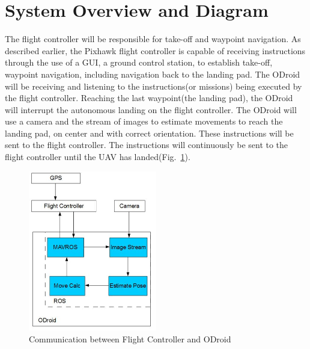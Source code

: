 \section{System Overview and Diagram}
The flight controller will be responsible for take-off and waypoint navigation. As described earlier, the Pixhawk flight controller is capable of receiving instructions through the use of a GUI, a ground control station, to establish take-off, waypoint navigation, including navigation back to the landing pad. The ODroid will be receiving and listening to the instructions(or missions) being executed by the flight controller. Reaching the last waypoint(the landing pad), the ODroid will interrupt the autonomous landing on the flight controller. The ODroid will use a camera and the stream of images to estimate movements to reach the landing pad, on center and with correct orientation. These instructions will be sent to the flight controller. The instructions will continuously be sent to the flight controller until the UAV has landed(Fig.~\ref{overviewdiag}).\\ 

\begin{figure}[h]
\begin{center}
\includegraphics[width=0.5\textwidth]{images/broad_approach1.PNG}
\end{center}
\caption{Communication between Flight Controller and ODroid \label{overviewdiag}}
\end{figure}

